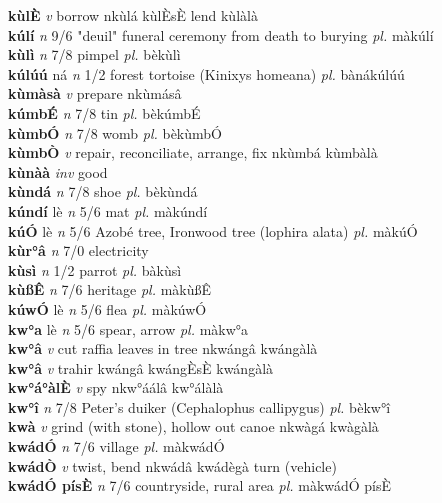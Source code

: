\documentclass{article}
\begin{document}
{\bf kùlÈ}  {\it v} borrow   nkùlá  kùlÈsÈ lend kùlàlà   \\ 
{\bf kúlí}  {\it n} 9/6 "deuil" funeral ceremony from death to burying {\it pl.} màkúlí         \\ 
{\bf kùlì}  {\it n} 7/8 pimpel {\it pl.} bèkùlì         \\ 
{\bf kúlúú} ná {\it n} 1/2 forest tortoise (Kinixys homeana) {\it pl.} bànákúlúú         \\ 
{\bf kùmàsà}  {\it v} prepare   nkùmásâ      \\ 
{\bf kúmbÉ}  {\it n} 7/8 tin {\it pl.} bèkúmbÉ         \\ 
{\bf kùmbÓ}  {\it n} 7/8 womb {\it pl.} bèkùmbÓ         \\ 
{\bf kùmbÒ}  {\it v} repair, reconciliate, arrange, fix   nkùmbá   kùmbàlà   \\ 
{\bf kùnàà}  {\it inv} good         \\ 
{\bf kùndá}  {\it n} 7/8 shoe {\it pl.} bèkùndá         \\ 
{\bf kúndí} lè {\it n} 5/6 mat {\it pl.} màkúndí         \\ 
{\bf kúÓ} lè {\it n} 5/6 Azobé tree, Ironwood tree (lophira alata) {\it pl.} màkúÓ         \\ 
{\bf kùr°â}  {\it n} 7/0 electricity         \\ 
{\bf kùsì}  {\it n} 1/2 parrot {\it pl.} bàkùsì         \\ 
{\bf kùßÊ}  {\it n} 7/6 heritage {\it pl.} màkùßÊ         \\ 
{\bf kúwÓ} lè {\it n} 5/6 flea {\it pl.} màkúwÓ         \\ 
{\bf kw°a} lè {\it n} 5/6 spear, arrow {\it pl.} màkw°a         \\ 
{\bf kw°â}  {\it v} cut raffia leaves in tree   nkwángâ   kwángàlà   \\ 
{\bf kw°â}  {\it v} trahir   kwángâ  kwángÈsÈ kwángàlà   \\ 
{\bf kw°á°àlÈ}  {\it v} spy   nkw°áálâ   kw°álàlà   \\ 
{\bf kw°î}  {\it n} 7/8 Peter's duiker (Cephalophus callipygus) {\it pl.} bèkw°î         \\ 
{\bf kwà}  {\it v} grind (with stone), hollow out canoe   nkwàgá   kwàgàlà   \\ 
{\bf kwádÓ}  {\it n} 7/6 village {\it pl.} màkwádÓ         \\ 
{\bf kwádÒ}  {\it v} twist, bend   nkwádâ    kwádègà turn (vehicle)  \\ 
{\bf kwádÓ písÈ}  {\it n} 7/6 countryside, rural area {\it pl.} màkwádÓ písÈ         \\ 
\end{document}
